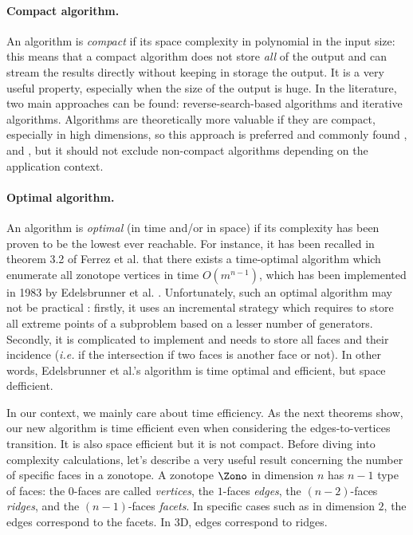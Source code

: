 \paragraph*{Compact algorithm.}
An algorithm is \emph{compact} if its space complexity in polynomial in the input size: this means that a compact algorithm does not store \emph{all} of the output and can stream the results directly without keeping in storage the output. It is a very useful property, especially when the size of the output is huge.
In the literature, two main approaches can be found: reverse-search-based algorithms and iterative algorithms. Algorithms are theoretically more valuable if they are compact, especially in high dimensions, so this approach is preferred and commonly found \cite{avisPivotingAlgorithmConvex}, \cite{guCounterfactualIdentificationLatent2022} and \cite{radaNewAlgorithmEnumeration2018}, but it should not exclude non-compact algorithms depending on the application context.

\paragraph*{Optimal algorithm.}
An algorithm is \emph{optimal} (in time and/or in space) if its complexity has been proven to be the lowest ever reachable. 
For instance, it has been recalled in theorem 3.2 of Ferrez et al. \cite{ferrezSolvingFixedRank2005a} that there exists a time-optimal algorithm which enumerate all zonotope vertices in time $O(m^{n-1})$, which has been implemented in 1983 by Edelsbrunner et al. \cite{edelsbrunnerConstructingArrangementsLines1983}.
Unfortunately, such an optimal algorithm may not be practical \cite{ferrezSolvingFixedRank2005a}: firstly, it uses an incremental strategy which requires to store all extreme points of a subproblem based on a lesser number of generators. Secondly, it is complicated to implement and needs to store all faces and their incidence (\emph{i.e.} if the intersection if two faces is another face or not). In other words, Edelsbrunner et al.'s algorithm is time optimal and efficient, but space defficient.


In our context, we mainly care about time efficiency. As the next theorems show, our new algorithm is time efficient even when considering the edges-to-vertices transition. It is also space efficient but it is not compact. 
Before diving into complexity calculations, let's describe a very useful result concerning the number of specific faces in a zonotope. A zonotope $\Zono$ in dimension $n$ has $n-1$ type of faces: the $0$-faces are called \emph{vertices}, the $1$-faces \emph{edges}, the $(n-2)$-faces \emph{ridges}, and the $(n-1)$-faces \emph{facets}. In specific cases such as in dimension $2$, the edges correspond to the facets. In 3D, edges correspond to ridges.

